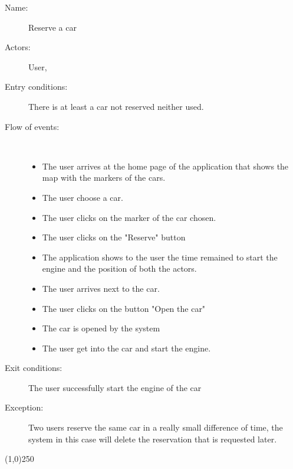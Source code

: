 \begin{description}
	\item[Name:] Reserve a car
	\item[Actors:] User,
	\item[Entry conditions:] There is at least a car not reserved neither used.
	\item[Flow of events:]  \ \\
		\begin{itemize}
			\item The user arrives at the home page of the application that shows the map with the markers of the cars.
			\item The user choose a car.
			\item The user clicks on the marker of the car chosen.
			\item The user clicks on the "Reserve" button
			\item The application shows to the user the time remained to start the engine and the position of both the actors.
			\item The user arrives next to the car.
			\item The user clicks on the button "Open the car"
			\item The car is opened by the system
			\item The user get into the car and start the engine.
		\end{itemize}
	\item[Exit conditions:] The user successfully start the engine of the car
	\item [Exception:] Two users reserve the same car in a really small difference of time, the system in this case will delete the reservation that is requested later.
\end{description}

\begin{center}
\line(1,0){250}
\end{center}

